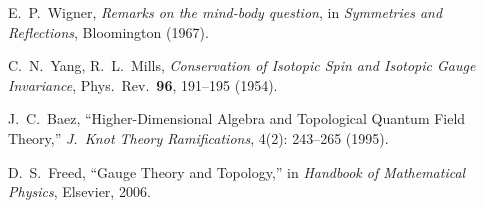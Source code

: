 \documentclass[12pt]{article}
\begin{document}
\vspace{1em}

\begin{thebibliography}{9}

E.~P.~Wigner, \emph{Remarks on the mind-body question}, 
in \emph{Symmetries and Reflections}, Bloomington (1967).

C.~N.~Yang, R.~L.~Mills, \emph{Conservation of Isotopic Spin and Isotopic Gauge Invariance},
Phys.\ Rev.\ \textbf{96}, 191--195 (1954).

J.~C.~Baez, ``Higher-Dimensional Algebra and Topological Quantum Field Theory,'' 
\emph{J.\ Knot Theory Ramifications}, 4(2): 243--265 (1995). 

D.~S.~Freed, ``Gauge Theory and Topology,'' 
in \emph{Handbook of Mathematical Physics}, Elsevier, 2006.

\end{thebibliography}
\end{document}
